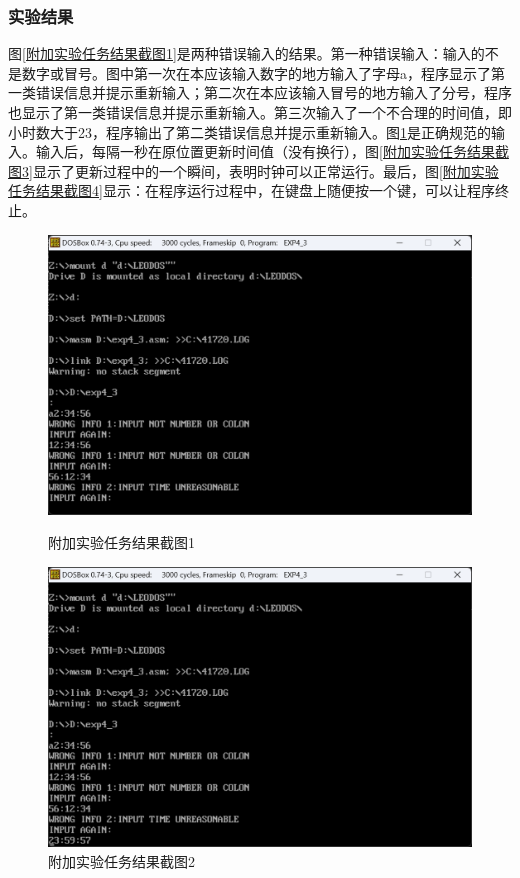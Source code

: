 \documentclass[12pt, a4paper, oneside]{ctexart}
\begin{document}
\subsubsection{实验结果}
图\ref{附加实验任务结果截图1}是两种错误输入的结果。第一种错误输入：输入的不是数字或冒号。图中第一次在本应该输入数字的地方输入了字母a，程序显示了第一类错误信息并提示重新输入；第二次在本应该输入冒号的地方输入了分号，程序也显示了第一类错误信息并提示重新输入。第三次输入了一个不合理的时间值，即小时数大于23，程序输出了第二类错误信息并提示重新输入。图\ref{附加实验任务结果截图2}是正确规范的输入。输入后，每隔一秒在原位置更新时间值（没有换行），图\ref{附加实验任务结果截图3}显示了更新过程中的一个瞬间，表明时钟可以正常运行。最后，图\ref{附加实验任务结果截图4}显示：在程序运行过程中，在键盘上随便按一个键，可以让程序终止。
\begin{figure}[H]
    \centering
    \begin{minipage}{0.45\textwidth}
    \centering
    \includegraphics[scale=0.48]{pic/exp4-2-wronginfo.png}
    \caption{附加实验任务结果截图1}
    \label{附加实验任务结果截图1}
    \end{minipage}
    \hspace{0.05\textwidth}
    \begin{minipage}{0.45\textwidth}
    \centering
    \includegraphics[scale=0.48]{pic/exp4-2-correctinput.png}
    \caption{附加实验任务结果截图2}
    \label{附加实验任务结果截图2}
    \end{minipage}
\end{figure}
\end{document}
